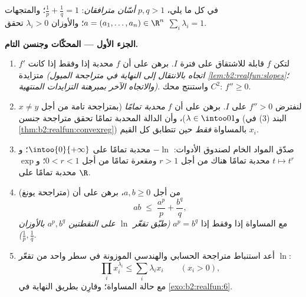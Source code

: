 \begin{problem}
\label{pb:b2:realfun:1}
في كل ما يلي، $p, q > 1$ \emph{أسّان مترافقان}: $\frac1p +
\frac1q = 1$؛ والمتجهات $a = (a_1, \dots, a_n) \in \R^n$؛
والأوزان $\lambda_i > 0$ تحقق $\sum_i\lambda_i = 1$.

\medskip
\noindent\textbf{الجزء الأول --- المحكّات وجنسن التام.}
\begin{enumerate}
  \item لتكن $f$ قابلة للاشتقاق على فترة $I$. برهن على أن
        $f$ محدبة إذا وفقط إذا كانت $f'$ متزايدة
        \emph{(اتجاه بالانتقال إلى النهاية في
        متراجحة الميول \cref{lem:b2:realfun:slopes}؛ والاتجاه
        الآخر بمبرهنة التزايدات المنتهية)}. واستنتج محك
        $C^2$: $f'' \geq 0$.
  \item لنفترض $f''> 0$ على $I$. برهن على أن $f$
        \emph{محدبة تمامًا} (بمتراجحة تامة من أجل $x \neq y$
        و$\lambda \in \intoo01$)، وأن الدالة المحدبة تمامًا
        تحقق متراجحة جنسن
        (البند (3) في \cref{thm:b2:realfun:convexreg}) بالمساواة
        \emph{فقط} حين تتطابق كل القيم $x_i$.
  \item صدّق المواد الخام لصندوق الأدوات: $-\ln$ محدبة تمامًا
        على $\intoo{0}{+\infty}$؛ و$t \mapsto t^r$
        محدبة تمامًا هناك من أجل $r > 1$ ومقعرة تمامًا
        من أجل $0 < r < 1$؛ و$\exp$ محدبة تمامًا على $\R$.
  \item (متراجحة يونغ) من أجل $a, b \geq 0$، برهن على أن
        \[
        ab \;\leq\; \frac{a^p}{p} + \frac{b^q}{q},
        \]
        مع المساواة إذا وفقط إذا $a^p = b^q$ \emph{(طبّق
        تقعّر $\ln$ على النقطتين $a^p, b^q$
        بالأوزان $\frac1p, \frac1q$)}.
  \item أعد استنباط متراجحة الحسابي والهندسي الموزونة في سطر واحد من
        تقعّر $\ln$:
        \[
        \prod_i x_i^{\lambda_i} \leq \sum_i\lambda_ix_i \qquad
        (x_i > 0),
        \]
        مع حالة المساواة؛ وقارِن بطريق النهاية في
        \cref{exo:b2:realfun:6}.
\end{enumerate}


\end{problem}
